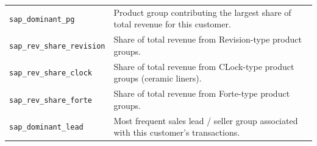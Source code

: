 \documentclass{article}
\begin{document}
\begin{longtable}{@{}p{5.4cm} p{10.6cm}@{}}
\texttt{sap\_\allowbreak dominant\_\allowbreak pg} & Product group contributing the largest share of total revenue for this customer. \\
\texttt{sap\_\allowbreak rev\_\allowbreak share\_\allowbreak revision} & Share of total revenue from Revision-type product groups. \\
\texttt{sap\_\allowbreak rev\_\allowbreak share\_\allowbreak clock} & Share of total revenue from CLock-type product groups (ceramic liners). \\
\texttt{sap\_\allowbreak rev\_\allowbreak share\_\allowbreak forte} & Share of total revenue from Forte-type product groups. \\
\texttt{sap\_\allowbreak dominant\_\allowbreak lead} & Most frequent sales lead / seller group associated with this customer's transactions. \\


\end{longtable}
\end{document}
